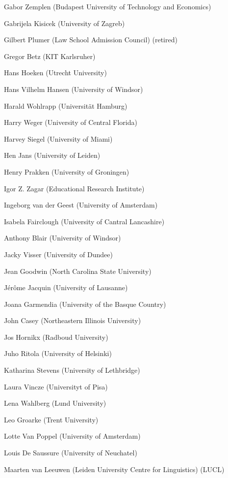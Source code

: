 \begin{compactitem}[]
		\item[] Gabor Zemplen (Budapest University of Technology and Economics)
		\item[] Gabrijela Kisicek (University of Zagreb)
		\item[] Gilbert Plumer (Law School Admission Council) (retired)
		\item[] Gregor Betz (KIT Karlsruher)
		\item[] Hans Hoeken (Utrecht University)
		\item[] Hans Vilhelm Hansen (University of Windsor)
		\item[] Harald Wohlrapp (Universität Hamburg)
		\item[] Harry Weger (University of Central Florida)
		\item[] Harvey Siegel (University of Miami)
		\item[] Hen Jans (University of Leiden)
		\item[] Henry Prakken (University of Groningen)
		\item[] Igor Z. Zagar (Educational Research Institute)
		\item[] Ingeborg van der Geest (University of Amsterdam)
		\item[] Isabela Fairclough (University of Cantral Lancashire)
		\item[] Anthony Blair (University of Windsor)
		\item[] Jacky Visser (University of Dundee)
		\item[] Jean Goodwin (North Carolina State University)
		\item[] Jérôme Jacquin (University of Lausanne)
		\item[] Joana Garmendia (University of the Basque Country)
		\item[] John Casey (Northeastern Illinois University)
		\item[] Jos Hornikx (Radboud University)
		\item[] Juho Ritola (University of Helsinki)
		\item[] Katharina Stevens (University of Lethbridge)
		\item[] Laura Vincze (Universityt of Pisa)
		\item[] Lena Wahlberg (Lund University)
		\item[] Leo Groarke (Trent University)
		\item[] Lotte Van Poppel (University of Amsterdam)
		\item[] Louis De Saussure (University of Neuchatel)
		\item[] Maarten van Leeuwen (Leiden University Centre for Linguistics) (LUCL)

\end{compactitem}
